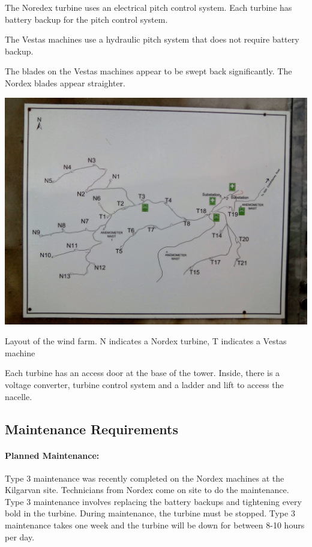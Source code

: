 \documentclass[12pt]{article} %
\begin{document}
The Noredex turbine uses an electrical pitch control system. Each turbine has battery backup for the pitch control system.

The Vestas machines use a hydraulic pitch system that does not require battery backup.

The blades on the Vestas machines appear to be swept back significantly. The Nordex blades appear straighter.

\begin{center}
  \includegraphics[width=1\textwidth]{kilgarvan_layout}
\end{center}
\caption{Layout of the wind farm. N indicates a Nordex turbine, T indicates a Vestas machine}

Each turbine has an access door at the base of the tower. Inside, there is a voltage converter, turbine control system and a ladder and lift to access the nacelle.

\subsection{Maintenance Requirements}
\paragraph{Planned Maintenance:}
Type 3 maintenance was recently completed on the Nordex machines at the Kilgarvan site. Technicians from Nordex come on site to do the maintenance. Type 3 maintenance involves replacing the battery backups and tightening every bold in the turbine. During maintenance, the turbine must be stopped. Type 3 maintenance takes one week and the turbine will be down for between 8-10 hours per day.
\end{document}
